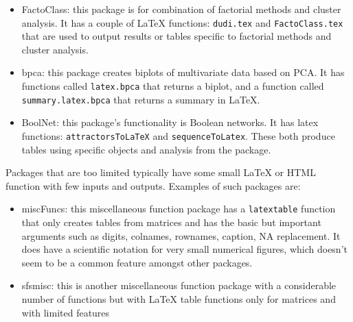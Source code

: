 \documentclass{memoir}\usepackage[]{graphicx}\usepackage[]{color}
\newcommand{\pkg}[1]{{\fontseries{b}\selectfont #1}}
\let\code=\texttt
\newcommand{\latex}{\LaTeX\xspace}
\begin{document}
\begin{itemize}
\item \pkg{FactoClass}\cite{FactoClass}: this package is for combination of factorial methods and cluster analysis. It has a couple of \latex functions: \code{dudi.tex} and \code{FactoClass.tex} that are used to output results or tables specific to factorial methods and cluster analysis. 
\item \pkg{bpca}\cite{bpca}: this package creates biplots of multivariate data based on PCA. It has functions called \code{latex.bpca} that returns a biplot, and a function called \code{summary.latex.bpca} that returns a summary in LaTeX.
\item \pkg{BoolNet}\cite{BoolNet}: this package's functionality is Boolean networks. It has latex functions: \code{attractorsToLaTeX} and \code{sequenceToLatex}. These both produce tables using specific objects and analysis from the package.
\end{itemize}
\vspace{10 pt} 
Packages that are too limited typically have some small \latex or HTML function with few inputs and outputs. Examples of such packages are:
\begin{itemize}
\item  \pkg{miscFuncs}\cite{miscFuncs}: this miscellaneous function package has a \code{latextable} function that only creates tables from matrices and has the basic but important arguments such as digits, colnames, rownames, caption, NA replacement. It does have a scientific notation for very small numerical figures, which doesn't seem to be a common feature amongst other packages.
\item \pkg{sfsmisc}\cite{sfsmisc}: this is another miscellaneous function package with a considerable number of functions but with \latex table functions only for matrices and with limited features
\end{itemize}
\end{document}
